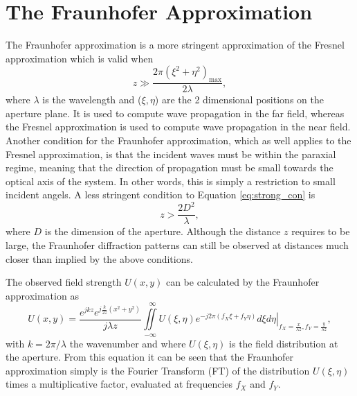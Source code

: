 \documentclass{article}
\begin{document}
\section{The Fraunhofer Approximation}
The Fraunhofer approximation is a more stringent approximation of the Fresnel approximation which is valid when
\begin{equation}
z\gg\frac{2\pi(\xi^2+\eta^2)_{\text{max}}}{2\lambda},
\label{eq:strong_con}
\end{equation}
where $\lambda$ is the wavelength and ($\xi,\eta$) are the 2 dimensional positions on the aperture plane. It is used to compute wave propagation in the far field, whereas the Fresnel approximation is used to compute wave propagation in the near field. Another condition for the Fraunhofer approximation, which as well applies to the Fresnel approximation, is that the incident waves must be within the paraxial regime, meaning that the direction of propagation must be small towards the optical axis of the system. In other words, this is simply a restriction to small incident angels. A less stringent condition to Equation \eqref{eq:strong_con} is 
\begin{equation}
z>\frac{2D^2}{\lambda},
\label{eq:normal_con}
\end{equation}
where $D$ is the dimension of the aperture. Although the distance $z$ requires to be large, the Fraunhofer diffraction patterns can still be observed at distances much closer than implied by the above conditions. 

The observed field strength $U(x,y)$ can be calculated by the Fraunhofer approximation as
\begin{equation}
U(x,y)=\frac{e^{jkz}e^{j\frac{k}{2z}(x^2+y^2)}}{j\lambda z}\iint\limits_{-\infty}^{~~~\infty} \left. U(\xi,\eta)e^{-j2\pi(f_X\xi+f_Y\eta)}d\xi d\eta \right|_{f_X=\frac{x}{\lambda z},f_Y=\frac{y}{\lambda z}},
\label{eq:fraunhofer}
\end{equation}
with $k=2\pi/\lambda$ the wavenumber and where $U(\xi,\eta)$ is the field distribution at the aperture. From this equation it can be seen that the Fraunhofer approximation simply is the Fourier Transform (FT) of the distribution $U(\xi,\eta)$ times a multiplicative factor, evaluated at frequencies $f_X$ and $f_Y$.
\end{document}
